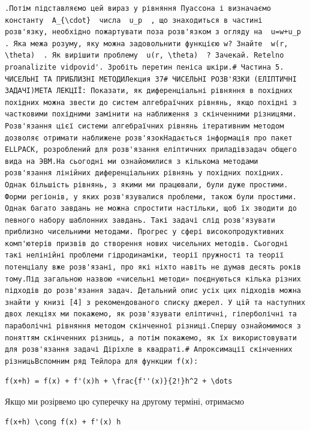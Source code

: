 \documentclass[
  ukrainian,
]{article}
\begin{document}
\begin{verbatim}
.Потім підставляємо цей вираз у рівняння Пуассона і визначаємо константу  A_{\cdot}  числа  u_p  , що знаходиться в частині розв'язку, необхідно пожартувати поза розв'язком з огляду на  u=w+u_p  . Яка межа розуму, яку можна задовольнити функцією w? Знайте  w(r, \theta)  . Як вирішити проблему  u(r, \theta)  ? Зачекай. Retelno proanalizite vidpovid'. Зробіть перетин пеніса шкіри.# Частина 5. ЧИСЕЛЬНІ ТА ПРИБЛИЗНІ МЕТОДИЛекция 37# ЧИСЕЛЬНІ РОЗВ'ЯЗКИ (ЕЛІПТИЧНІ ЗАДАЧІ)МЕТА ЛЕКЦІЇ: Показати, як диференціальні рівняння в похідних похідних можна звести до систем алгебраїчних рівнянь, якщо похідні з частковими похідними замінити на наближення з скінченними різницями. Розв'язання цієї системи алгебраїчних рівнянь ітеративним методом дозволяє отримати наближене розв'язокНадається інформація про пакет ELLPACK, розроблений для розв'язання еліптичних приладівзадач общего вида на ЭВМ.На сьогодні ми ознайомилися з кількома методами розв'язання лінійних диференціальних рівнянь у похідних похідних. Однак більшість рівнянь, з якими ми працювали, були дуже простими. Форми регіонів, у яких розв'язувалися проблеми, також були простими. Однак багато завдань не можна спростити настільки, щоб їх зводити до певного набору шаблонних завдань. Такі задачі слід розв'язувати приблизно чисельними методами. Прогрес у сфері високопродуктивних комп'ютерів призвів до створення нових чисельних методів. Сьогодні такі нелінійні проблеми гідродинаміки, теорії пружності та теорії потенціалу вже розв'язані, про які ніхто навіть не думав десять років тому.Під загальною назвою «чисельні методи» поєднуються кілька різних підходів до розв'язання задач. Детальний опис усіх цих підходів можна знайти у книзі [4] з рекомендованого списку джерел. У цій та наступних двох лекціях ми покажемо, як розв'язувати еліптичні, гіперболічні та параболічні рівняння методом скінченної різниці.Спершу ознайомимося з поняттям скінченних різниць, а потім покажемо, як їх використовувати для розв'язання задачі Діріхле в квадраті.# Апроксимації скінченних різницьВспомним ряд Тейлора для функции f(x):
\end{verbatim}

\begin{verbatim}
f(x+h) = f(x) + f'(x)h + \frac{f''(x)}{2!}h^2 + \dots
\end{verbatim}

Якщо ми розірвемо цю суперечку на другому терміні, отримаємо

\begin{verbatim}
f(x+h) \cong f(x) + f'(x) h
\end{verbatim}
\end{document}
